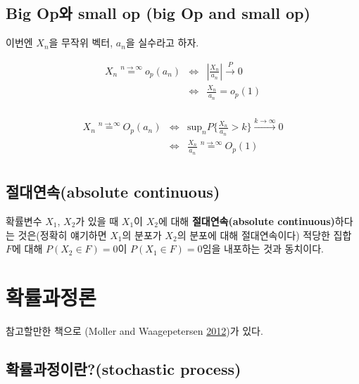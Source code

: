 \documentclass[b5paper,]{book}
\theoremstyle{definition}
\theoremstyle{definition}
\theoremstyle{definition}
\theoremstyle{remark}
\begin{document}
\section{Big Op와 small op (big Op and small
op)}\label{big-op-small-op-big-op-and-small-op}

이번엔 \(X_{n}\)을 무작위 벡터, \(a_{n}\)을 실수라고 하자.

\begin{eqnarray*}
X_{n}\stackrel{n\rightarrow \infty}{=}o_{p}(a_{n}) &\Leftrightarrow& |\frac{X_{n}}{a_{n}}|\stackrel{P}{\rightarrow}0 \\
&\Leftrightarrow& \frac{X_{n}}{a_{n}}=o_{p}(1)\\
\end{eqnarray*}

\begin{eqnarray*}
X_{n}\stackrel{n\rightarrow \infty}{=}O_{p}(a_{n}) &\Leftrightarrow& \text{sup}_{n} P\{ \frac{X_{n}}{a_{n}}>k\}\stackrel{k\rightarrow\infty}{\rightarrow}0 \\
&\Leftrightarrow& \frac{X_{n}}{a_{n}}\stackrel{n\rightarrow \infty}{=}O_{p}(1)\\
\end{eqnarray*}

\section{절대연속(absolute continuous)}\label{absolute-continuous}

확률변수 \(X_{1}\), \(X_{2}\)가 있을 때 \(X_{1}\)이 \(X_{2}\)에 대해
\textbf{절대연속(absolute continuous)}하다는 것은(정확히 얘기하면
\(X_{1}\)의 분포가 \(X_{2}\)의 분포에 대해 절대연속이다) 적당한 집합
\(F\)에 대해 \(P(X_{2}\in F)=0\)이 \(P(X_{1}\in F)=0\)임을 내포하는 것과
동치이다.

\chapter{확률과정론}\label{stoprocess}

참고할만한 책으로 (Moller and Waagepetersen
\protect\hyperlink{ref-Lindgren2012}{2012})가 있다.

\section{확률과정이란?(stochastic process)}\label{stochastic-process}
\end{document}

